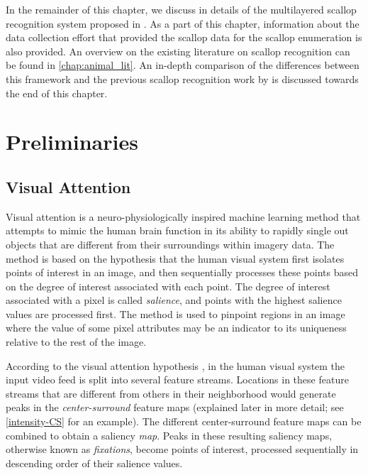 \documentclass {udthesis}
\begin{document}
In the remainder of this chapter, we discuss in details of the multilayered scallop recognition system proposed in 
\cite{prasanna_med, prasanna_aslo, prasanna_igi}. As a part of this chapter, information about the data collection effort
that provided the scallop data for the scallop enumeration is also provided. An overview on the existing literature on scallop recognition
can be found in \ref{chap:animal_lit}.
An in-depth comparison of the differences
between this framework and the previous scallop recognition work by \cite{dawkings13} is discussed towards the end of this chapter.

\section{Preliminaries}

\subsection{Visual Attention}

Visual attention is a neuro-physiologically inspired machine learning method \cite{koch}
that attempts to mimic the human brain function in its ability to rapidly single out
objects that are different from their surroundings within imagery data.
The method is based on the hypothesis that the human visual system first isolates 
points of interest in an image, and then sequentially processes these points 
based on the degree of interest associated with each point.
The degree of interest associated with a pixel is called \emph{salience},
and points with the highest salience values are processed first.
The method is used to pinpoint 
regions in an image where the value of some pixel attributes may be an indicator to
its uniqueness relative to the rest of the image.  

According to the visual attention hypothesis \cite{koch}, in the 
human visual system the input video feed 
is split into several feature streams.
Locations in these feature streams that are different from others in their neighborhood would generate 
peaks in the \emph{center-surround} feature maps (explained later in more detail; see \eqref{intensity-CS} for an example).
The different center-surround feature maps can be combined to obtain a 
saliency \emph{map}.
Peaks in these resulting saliency maps, otherwise known as \emph{fixations}, become 
points of interest, processed sequentially in descending order of their salience values.
\end{document}
